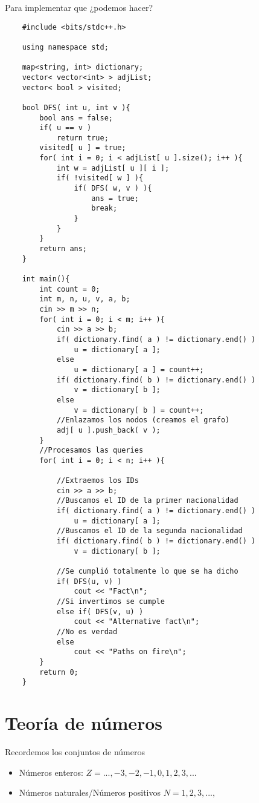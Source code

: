 Para implementar que ¿podemos hacer?

\begin{lstlisting}
    #include <bits/stdc++.h>

    using namespace std;

    map<string, int> dictionary;
    vector< vector<int> > adjList;
    vector< bool > visited;
    
    bool DFS( int u, int v ){
        bool ans = false;
        if( u == v )
            return true;
        visited[ u ] = true;
        for( int i = 0; i < adjList[ u ].size(); i++ ){
            int w = adjList[ u ][ i ];
            if( !visited[ w ] ){
                if( DFS( w, v ) ){
                    ans = true;
                    break;
                }
            }
        }
        return ans;
    }

    int main(){
        int count = 0;
        int m, n, u, v, a, b;
        cin >> m >> n;
        for( int i = 0; i < m; i++ ){
            cin >> a >> b;
            if( dictionary.find( a ) != dictionary.end() )
                u = dictionary[ a ];
            else 
                u = dictionary[ a ] = count++;
            if( dictionary.find( b ) != dictionary.end() )
                v = dictionary[ b ];
            else 
                v = dictionary[ b ] = count++;
            //Enlazamos los nodos (creamos el grafo)
            adj[ u ].push_back( v );
        }
        //Procesamos las queries
        for( int i = 0; i < n; i++ ){

            //Extraemos los IDs 
            cin >> a >> b;
            //Buscamos el ID de la primer nacionalidad
            if( dictionary.find( a ) != dictionary.end() )
                u = dictionary[ a ];
            //Buscamos el ID de la segunda nacionalidad
            if( dictionary.find( b ) != dictionary.end() )
                v = dictionary[ b ];

            //Se cumplió totalmente lo que se ha dicho
            if( DFS(u, v) )
                cout << "Fact\n";
            //Si invertimos se cumple
            else if( DFS(v, u) )
                cout << "Alternative fact\n";
            //No es verdad
            else 
                cout << "Paths on fire\n";
        }
        return 0;
    }
\end{lstlisting}

\chapter{Teoría de números}
Recordemos los conjuntos de números 
\begin{itemize}
    \item Números enteros: $Z = {..., -3, -2, -1, 0, 1, 2, 3, ... }$
    \item Números naturales/Números positivos $N = {1, 2, 3, ..., }$
\end{itemize}

